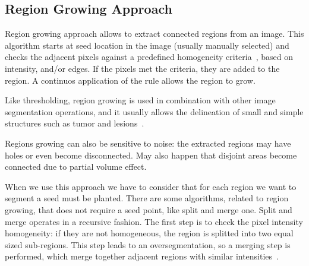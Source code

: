 \documentclass{standalone}
\begin{document}
\subsection{Region Growing Approach}

Region growing approach allows to extract connected regions from an image. This algorithm starts at seed location in the image (usually manually selected) and checks the adjacent pixels against a predefined homogeneity criteria~\cite{INP:Withey}, based on intensity, and/or edges.   If the pixels met the criteria, they are added to the region. A continuos application of the rule allows the region to grow. 

Like thresholding, region growing is used in combination with other image segmentation operations, and it usually allows the delineation of small and simple structures such as tumor and lesions~\cite{ART:Pham}.

Regions growing can also be sensitive to noise: the extracted regions may have holes or even become disconnected. May also happen that disjoint areas become connected due to partial volume effect. 

When we use this approach we have to consider that for each region we want to segment a seed must be planted. There are some algorithms, related to region growing, that does not require a seed point, like split and merge one. Split and merge operates in a recursive fashion. The first step is to check the pixel intensity homogeneity: if they are not homogeneous, the region is splitted into two equal sized sub-regions. This step leads to an oversegmentation, so a merging step is performed, which merge together adjacent regions with similar intensities~\cite{INP:Withey}. 
\end{document}
